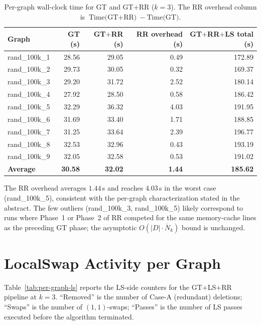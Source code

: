 \documentclass[11pt,a4paper]{article}
\newcommand{\Nk}{\overline{N}_k}
\begin{document}
\begin{table}[ht]
\centering
\caption{Per-graph wall-clock time for GT and GT$+$RR ($k=3$). The RR
  overhead column is $\text{Time(GT$+$RR)}-\text{Time(GT)}$.}
\label{tab:per-graph-rr-time}
\small
\begin{tabular}{lrrrr}
\toprule
\textbf{Graph} & \textbf{GT (s)} & \textbf{GT$+$RR (s)}
  & \textbf{RR overhead (s)} & \textbf{GT$+$RR$+$LS total (s)}\\
\midrule
rand\_100k\_1 & 28.56 & 29.05 & 0.49 & 172.89 \\
rand\_100k\_2 & 29.73 & 30.05 & 0.32 & 169.37 \\
rand\_100k\_3 & 29.20 & 31.72 & 2.52 & 180.14 \\
rand\_100k\_4 & 27.92 & 28.50 & 0.58 & 186.42 \\
rand\_100k\_5 & 32.29 & 36.32 & 4.03 & 191.95 \\
rand\_100k\_6 & 31.69 & 33.40 & 1.71 & 188.85 \\
rand\_100k\_7 & 31.25 & 33.64 & 2.39 & 196.77 \\
rand\_100k\_8 & 32.53 & 32.96 & 0.43 & 193.19 \\
rand\_100k\_9 & 32.05 & 32.58 & 0.53 & 191.02 \\
\midrule
\textbf{Average} & \textbf{30.58} & \textbf{32.02}
  & \textbf{1.44} & \textbf{185.62} \\
\bottomrule
\end{tabular}
\end{table}

The RR overhead averages $1.44$\,s and reaches $4.03$\,s in the
worst case (rand\_100k\_5), consistent with the per-graph
characterization stated in the abstract. The few outliers
(rand\_100k\_3, rand\_100k\_5) likely correspond to runs where Phase~1
or Phase~2 of RR competed for the same memory-cache lines as the
preceding GT phase; the asymptotic $O(|D|\cdot\Nk)$ bound is unchanged.


\section{LocalSwap Activity per Graph}
\label{app:per-graph-ls}

Table~\ref{tab:per-graph-ls} reports the LS-side counters for the
GT$+$LS$+$RR pipeline at $k=3$. ``Removed'' is the number of
\mbox{Case-A} (redundant) deletions; ``Swaps'' is the number of
$(1,1)$-swaps; ``Passes'' is the number of LS passes executed before
the algorithm terminated.
\end{document}
